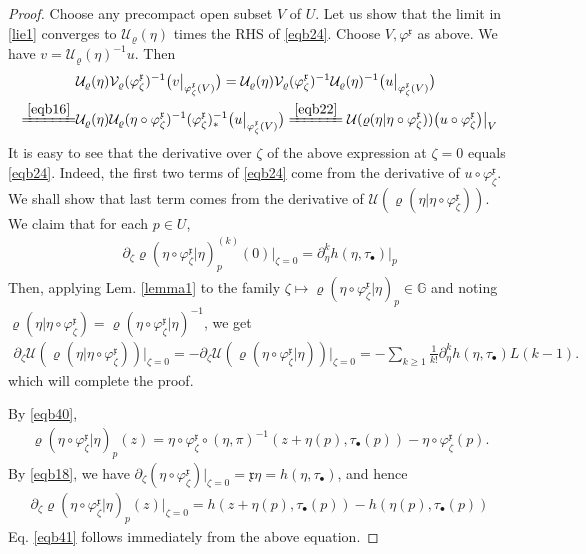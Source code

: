 \documentclass[11pt,b5paper,notitlepage]{article}
\theoremstyle{definition}
\theoremstyle{plain}
\newcommand{\fk}{\mathfrak}
\newcommand{\mc}{\mathcal}
\newcommand{\xk}{\mathfrak x}
\newcommand{\blt}{\bullet}
\newcommand{\Gbb}{\mathbb G}
\newcommand{\<}{\left\langle}
\renewcommand{\>}{\right\rangle}
\numberwithin{equation}{subsection}
\begin{document}
\begin{proof}
Choose any precompact open subset $V$ of $U$. Let us show that the limit in \eqref{lie1} converges to $\mc U_\varrho(\eta)$ times the RHS of \eqref{eqb24}. Choose $V,\varphi^{\fk x}$ as above. We have $v=\mc U_\varrho(\eta)^{-1}u$. Then
\begin{align*}
&\mc U_\varrho(\eta)\mc V_\varrho(\varphi^{\fk x}_\zeta)^{-1}\big(v\big|_{\varphi^{\fk x}_\zeta(V)}\big)=\mc U_\varrho(\eta)\mc V_\varrho(\varphi^{\fk x}_\zeta)^{-1}\mc U_\varrho(\eta)^{-1}\big(u\big|_{\varphi^{\fk x}_\zeta(V)}\big)\\
\xlongequal{\eqref{eqb16}}&\mc U_\varrho(\eta)\mc U_\varrho(\eta\circ\varphi^{\fk x}_\zeta)^{-1}(\varphi^{\fk x}_\zeta)_*^{-1}\big(u\big|_{\varphi^{\fk x}_\zeta(V)}\big)\xlongequal{\eqref{eqb22}}\mc U(\varrho(\eta|\eta\circ\varphi^\xk_\zeta))\big(u\circ\varphi^{\fk x}_\zeta\big)\big|_V
\end{align*}
It is easy to see that the derivative over  $\zeta$ of the above expression at $\zeta=0$ equals \eqref{eqb24}. Indeed, the first two terms of \eqref{eqb24} come from the derivative of $u\circ\varphi^{\fk x}_\zeta$. We shall show that last term comes from the derivative of $\mc U(\varrho(\eta|\eta\circ\varphi_\zeta^{\fk x}))$. We claim that for each $p\in U$,
\begin{align*}\label{eqb41}
\partial_\zeta\varrho(\eta\circ\varphi^\xk_\zeta|\eta)^{(k)}_p(0)\big|_{\zeta=0}=\partial_\eta^k h(\eta,\tau_\blt)\big|_p  \tag{$\star$}
\end{align*}
Then, applying Lem. \ref{lemma1} to the family $\zeta\mapsto \varrho(\eta\circ\varphi_\zeta^\xk|\eta)_p\in\Gbb$ and noting $\varrho(\eta|\eta\circ\varphi_\zeta^{\fk x})=\varrho(\eta\circ\varphi_\zeta^{\fk x}|\eta)^{-1}$, we get
\begin{align*}
\partial_\zeta\mc U(\varrho(\eta|\eta\circ\varphi_\zeta^{\fk x}))\big|_{\zeta=0}=-\partial_\zeta\mc U(\varrho(\eta\circ\varphi_\zeta^{\fk x}|\eta))\big|_{\zeta=0}=-\sum_{k\geq 1}\frac 1{k!}\partial_\eta^k h(\eta,\tau_\blt)L(k-1).
\end{align*}
which will complete the proof.

By \eqref{eqb40},  
\begin{align*}
\varrho(\eta\circ\varphi^\xk_\zeta|\eta)_p(z)=\eta\circ\varphi_{\zeta}^\xk\circ(\eta,\pi)^{-1}(z+\eta(p),\tau_\blt(p))-\eta\circ\varphi_\zeta^\xk(p).
\end{align*}
By \eqref{eqb18}, we have $\partial_\zeta (\eta\circ\varphi_{\zeta}^\xk)\big|_{\zeta=0}=\xk\eta=h(\eta,\tau_\blt)$, and hence
\begin{align*}
\partial_\zeta\varrho(\eta\circ\varphi^\xk_\zeta|\eta)_p(z)\big|_{\zeta=0}=h(z+\eta(p),\tau_\blt(p))-h(\eta(p),\tau_\blt(p))
\end{align*}
Eq. \eqref{eqb41} follows immediately from the above equation.
\end{proof}
\end{document}
